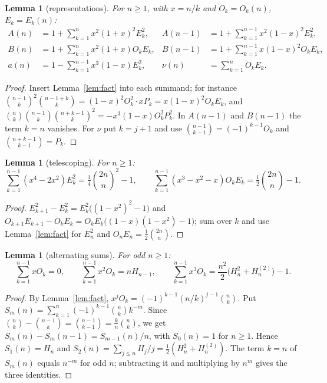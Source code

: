 \documentclass[11pt]{amsart}
\newtheorem{lemma}[theorem]{Lemma}
\theoremstyle{definition}
\theoremstyle{remark}
\newcommand{\bin}[2]{\binom{#1}{#2}}
\begin{document}
\begin{lemma}[representations]\label{lem:reps}
For $n\ge1$, with $x=n/k$ and $O_k=O_k(n)$, $E_k=E_k(n)$:
\begin{align*}
A(n)&=1+\sum_{k=1}^{n}x^2(1+x)^2E_k^2, & A(n-1)&=1+\sum_{k=1}^{n-1}x^2(1-x)^2E_k^2,\\
B(n)&=1+\sum_{k=1}^{n}x^2(1+x)O_kE_k, & B(n-1)&=1+\sum_{k=1}^{n-1}x(1-x)^2O_kE_k,\\
a(n)&=1-\sum_{k=1}^{n-1}x^3(1-x)E_k^2, & \nu(n)&=\sum_{k=1}^{n}O_kE_k .
\end{align*}
\end{lemma}
\begin{proof}
Insert Lemma~\ref{lem:fact} into each summand; for instance
$\binom{n-1}k^2\binom{n-1+k}{k}=(1-x)^2O_k^2\cdot xP_k=x(1-x)^2O_kE_k$, and
$\binom nk\binom{n-1}k\binom{n+k-1}k^2=-x^3(1-x)O_k^2P_k^2$. In $A(n-1)$ and $B(n-1)$ the term
$k=n$ vanishes. For $\nu$ put $k=j+1$ and use $\binom{n-1}{k-1}=(-1)^{k-1}O_k$ and
$\binom{n+k-1}{k-1}=P_k$.
\end{proof}

\begin{lemma}[telescoping]\label{lem:tel}
For $n\ge1$:
\[
\sum_{k=1}^{n-1}(x^4-2x^2)E_k^2=\tfrac14\bin{2n}n^2-1,\qquad
\sum_{k=1}^{n-1}(x^3-x^2-x)O_kE_k=\tfrac12\bin{2n}n-1 .
\]
\end{lemma}
\begin{proof}
$E_{k+1}^2-E_k^2=E_k^2\bigl((1-x^2)^2-1\bigr)$ and
$O_{k+1}E_{k+1}-O_kE_k=O_kE_k\bigl((1-x)(1-x^2)-1\bigr)$; sum over $k$ and use
Lemma~\ref{lem:fact} for $E_n^2$ and $O_nE_n=\tfrac12\binom{2n}n$.
\end{proof}

\begin{lemma}[alternating sums]\label{lem:alt}
For odd $n\ge1$:
\[
\sum_{k=1}^{n-1}xO_k=0,\qquad \sum_{k=1}^{n-1}x^2O_k=nH_{n-1},\qquad
\sum_{k=1}^{n-1}x^3O_k=\frac{n^2}2\bigl(H_n^2+H_n^{(2)}\bigr)-1 .
\]
\end{lemma}
\begin{proof}
By Lemma~\ref{lem:fact}, $x^{j}O_k=(-1)^{k-1}(n/k)^{j-1}\binom nk$. Put
$S_m(n)=\sum_{k=1}^n(-1)^{k-1}\binom nk k^{-m}$. Since
$\binom nk-\binom{n-1}k=\binom{n-1}{k-1}=\frac kn\binom nk$, we get
$S_m(n)-S_m(n-1)=S_{m-1}(n)/n$, with $S_0(n)=1$ for $n\ge1$. Hence $S_1(n)=H_n$ and
$S_2(n)=\sum_{j\le n}H_j/j=\tfrac12(H_n^2+H_n^{(2)})$. The term $k=n$ of $S_m(n)$ equals
$n^{-m}$ for odd $n$; subtracting it and multiplying by $n^{m}$ gives the three identities.
\end{proof}
\end{document}
